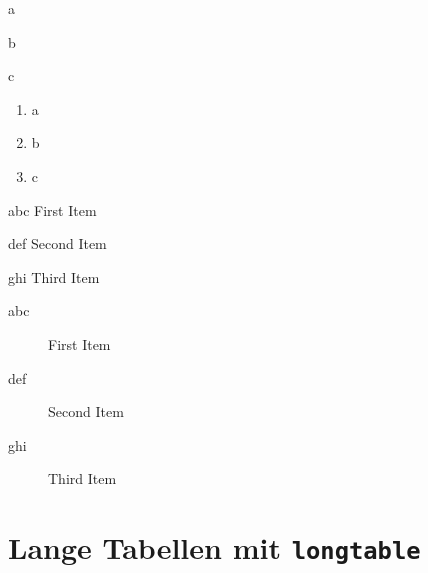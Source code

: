 \begin{compactenum}
\item a
\item b
\item c
\end{compactenum}

\begin{enumerate}
\item a
\item b
\item c
\end{enumerate}

\begin{compactdesc}
\item[abc] First Item
\item[def] Second Item
\item[ghi] Third Item
\end{compactdesc}


\begin{description}
\item[abc] First Item
\item[def] Second Item
\item[ghi] Third Item
\end{description}

\section{Lange Tabellen mit \texttt{longtable}}\label{sec:longtable}

